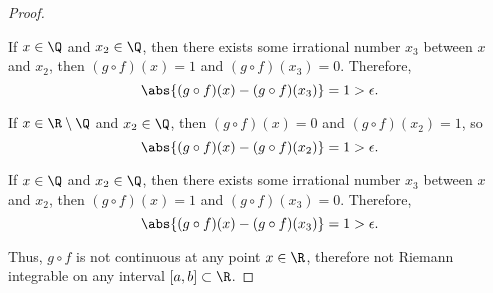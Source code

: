 \begin{proof}
\begin{enumarabic}
    \item If $x \in \Q$ and $x_2 \in \Q$, then there exists some irrational number
      $x_3$ between $x$ and $x_2$, then $(g \circ f)(x) = 1$
      and $(g \circ f)(x_3) = 0$. Therefore,
      \[ \abs{(g \circ f)(x) - (g \circ f)(x_3)} = 1 > \epsilon. \]
    \item If $x \in \R \setminus \Q$ and $x_2 \in \Q$, then
      $(g \circ f)(x) = 0$ and $(g \circ f)(x_2) = 1$,
      so \[ \abs{(g \circ f)(x) - (g \circ f)(x_2)} = 1 > \epsilon. \]
    \item If $x \in \Q$ and $x_2 \in \Q$, then there exists some irrational number
      $x_3$ between $x$ and $x_2$, then $(g \circ f)(x) = 1$
      and $(g \circ f)(x_3) = 0$. Therefore,
      \[ \abs{(g \circ f)(x) - (g \circ f)(x_3)} = 1 > \epsilon. \]
  \end{enumarabic}

  \step
  Thus,  $g \circ f$ is not continuous at any point $x \in \R$,
  therefore not Riemann integrable on any interval $[a, b] \subset \R$.
\end{proof}
 
